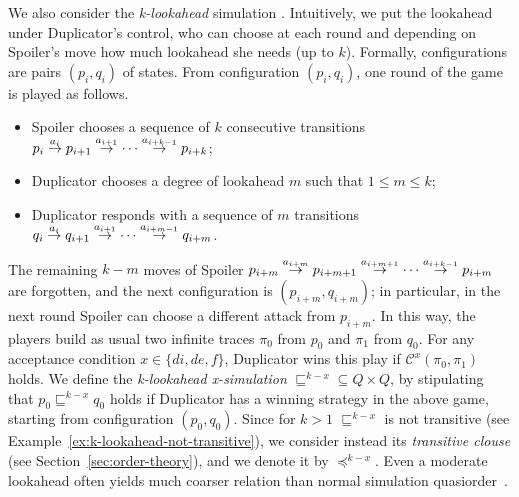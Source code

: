 We also consider the \emph{k-lookahead} simulation \cite{clemente2017efficient}.
Intuitively, we put the lookahead under Duplicator's control, who can choose
at each round and depending on Spoiler’s move how much lookahead she needs (up to $k$).
Formally, configurations are pairs $(p_i,q_i)$ of states.
From configuration $(p_i, q_i)$, one round of the game is played as follows.
\begin{itemize}
\item Spoiler chooses a sequence of $k$ consecutive transitions
$p_i \overset{a_i}{\rightarrow} p_{i+1} \overset{a_{i+1}}{\rightarrow} \cdots \overset{a_{i+k-1}}{\rightarrow} p_{i+k}$;
\item Duplicator chooses a degree of lookahead $m$ such that $1 \leq m \leq k$;
\item Duplicator responds with a sequence of $m$ transitions
$q_i \overset{a_i}{\rightarrow} q_{i+1} \overset{a_{i+1}}{\rightarrow} \cdots \overset{a_{i+m-1}}{\rightarrow} q_{i+m}$.
\end{itemize}
The remaining $k - m$ moves of Spoiler
$p_{i+m} \overset{a_{i+m}}{\rightarrow} p_{i+m+1} \overset{a_{i+m+1}}{\rightarrow} \cdots \overset{a_{i+k-1}}{\rightarrow} p_{i+m}$
are forgotten, and the next configuration is $(p_{i+m}, q_{i+m})$;
in particular, in the next round Spoiler can choose a different attack from $p_{i+m}$.
In this way, the players build as usual two infinite traces $\pi_0$ from $p_0$
and $\pi_1$ from $q_0$.
For any acceptance condition $x \in \{di, de, f\}$, Duplicator wins this play if
$\mathcal{C}^x(\pi_0,\pi_1)$ holds.
We define the \emph{k-lookahead x-simulation} $\mathord{\sqsubseteq^{k-x}} \subseteq Q \times Q$,
by stipulating that $p_0 \sqsubseteq^{k-x} q_0$ holds if Duplicator has a winning
strategy in the above game, starting from configuration $(p_0,q_0)$.
Since for $k > 1$ $\sqsubseteq^{k-x}$ is not transitive
(see Example~\ref{ex:k-lookahead-not-transitive}), we consider instead its
\emph{transitive clouse} (see Section~\ref{sec:order-theory}), and we denote it by $\preceq^{k-x}$.
Even a moderate lookahead often yields much coarser relation than normal
simulation quasiorder~\cite{clemente2017efficient}.

